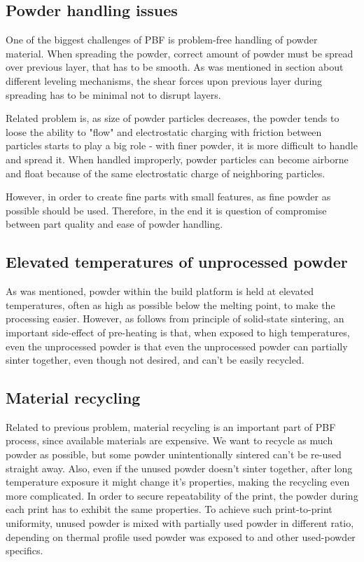 \documentclass[a4paper, twoside, 11pt]{report}
\begin{document}
\subsection{Powder handling issues}
One of the biggest challenges of PBF is problem-free handling of powder material. When spreading the powder, correct amount of powder must be spread over previous layer, that has to be smooth. As was mentioned in section about different leveling mechanisms, the shear forces upon previous layer during spreading has to be minimal not to disrupt layers.

	Related problem is, as size of powder particles decreases, the powder tends to loose the ability to "flow" and electrostatic charging with friction between particles starts to play a big role - with finer powder, it is more difficult to handle and spread it. When handled improperly, powder particles can become airborne and float because of the same electrostatic charge of neighboring particles.
	
	However, in order to create fine parts with small features, as fine powder as possible should be used. Therefore, in the end it is question of compromise between part quality and ease of powder handling.
\subsection{Elevated temperatures of unprocessed powder}
As was mentioned, powder within the build platform is held at elevated temperatures, often as high as possible below the melting point, to make the processing easier. However, as follows from principle of solid-state sintering, an important side-effect of pre-heating is that, when exposed to high temperatures, even the unprocessed powder is that even the unprocessed powder can partially sinter together, even though not desired, and can't be easily recycled.
\subsection{Material recycling}
Related to previous problem, material recycling is an important part of PBF process, since available materials are expensive. We want to recycle as much powder as possible, but some powder unintentionally sintered can't be re-used straight away. Also, even if the unused powder doesn't sinter together, after long temperature exposure it might change it's properties, making the recycling even more complicated. In order to secure repeatability of the print, the powder during each print has to exhibit the same properties. To achieve such print-to-print uniformity, unused powder is mixed with partially used powder in different ratio, depending on thermal profile used powder was exposed to and other used-powder specifics.
\end{document}
